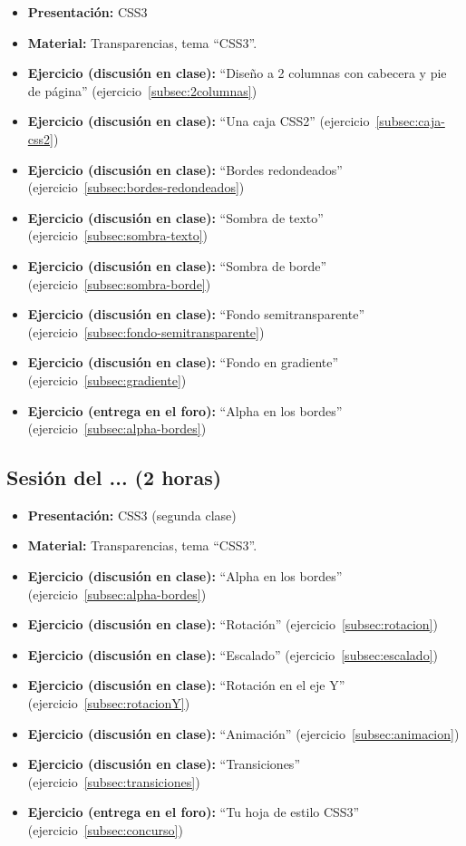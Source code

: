 \documentclass[a4paper,12pt]{report}
\begin{document}
\begin{itemize}
\item \textbf{Presentación:} CSS3
\item \textbf{Material:} Transparencias, tema ``CSS3''.
\item \textbf{Ejercicio (discusión en clase):} ``Diseño a 2 columnas con cabecera y pie de página'' (ejercicio~\ref{subsec:2columnas})
\item \textbf{Ejercicio (discusión en clase):} ``Una caja CSS2'' (ejercicio~\ref{subsec:caja-css2})
\item \textbf{Ejercicio (discusión en clase):} ``Bordes redondeados'' (ejercicio~\ref{subsec:bordes-redondeados})
\item \textbf{Ejercicio (discusión en clase):} ``Sombra de texto'' (ejercicio~\ref{subsec:sombra-texto})
\item \textbf{Ejercicio (discusión en clase):} ``Sombra de borde'' (ejercicio~\ref{subsec:sombra-borde})
\item \textbf{Ejercicio (discusión en clase):} ``Fondo semitransparente'' (ejercicio~\ref{subsec:fondo-semitransparente})
\item \textbf{Ejercicio (discusión en clase):} ``Fondo en gradiente'' (ejercicio~\ref{subsec:gradiente})
\item \textbf{Ejercicio (entrega en el foro):} ``Alpha en los bordes'' (ejercicio~\ref{subsec:alpha-bordes})
\end{itemize}

\subsection{Sesión del ... (2 horas)}


\begin{itemize}
\item \textbf{Presentación:} CSS3 (segunda clase)
\item \textbf{Material:} Transparencias, tema ``CSS3''.
\item \textbf{Ejercicio (discusión en clase):} ``Alpha en los bordes'' (ejercicio~\ref{subsec:alpha-bordes})
\item \textbf{Ejercicio (discusión en clase):} ``Rotación'' (ejercicio~\ref{subsec:rotacion})
\item \textbf{Ejercicio (discusión en clase):} ``Escalado'' (ejercicio~\ref{subsec:escalado})
\item \textbf{Ejercicio (discusión en clase):} ``Rotación en el eje Y'' (ejercicio~\ref{subsec:rotacionY})
\item \textbf{Ejercicio (discusión en clase):} ``Animación'' (ejercicio~\ref{subsec:animacion})
\item \textbf{Ejercicio (discusión en clase):} ``Transiciones'' (ejercicio~\ref{subsec:transiciones})
\item \textbf{Ejercicio (entrega en el foro):} ``Tu hoja de estilo CSS3'' (ejercicio~\ref{subsec:concurso})
\end{itemize}
\end{document}
